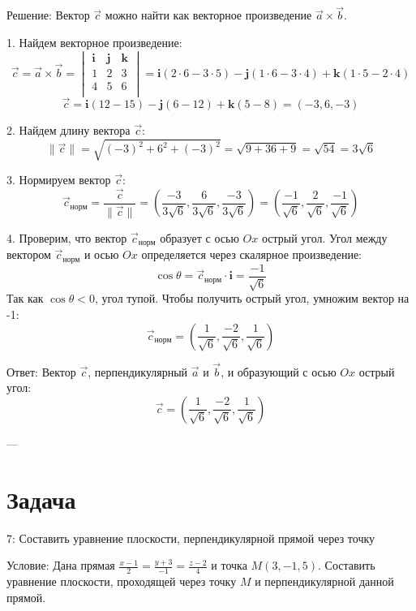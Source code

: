 \documentclass[a4paper,14pt]{extreport} %
\begin{document}
 Решение:   
Вектор \( \vec{c} \) можно найти как векторное произведение \( \vec{a} \times \vec{b} \).

1. Найдем векторное произведение:
   \[
   \vec{c} = \vec{a} \times \vec{b} = 
   \begin{vmatrix}
   \mathbf{i} & \mathbf{j} & \mathbf{k} \\
   1 & 2 & 3 \\
   4 & 5 & 6 \\
   \end{vmatrix}
   = \mathbf{i}(2 \cdot 6 - 3 \cdot 5) - \mathbf{j}(1 \cdot 6 - 3 \cdot 4) + \mathbf{k}(1 \cdot 5 - 2 \cdot 4)
   \]
   \[
   \vec{c} = \mathbf{i}(12 - 15) - \mathbf{j}(6 - 12) + \mathbf{k}(5 - 8) = (-3, 6, -3)
   \]

2. Найдем длину вектора \( \vec{c} \):
   \[
   \| \vec{c} \| = \sqrt{(-3)^2 + 6^2 + (-3)^2} = \sqrt{9 + 36 + 9} = \sqrt{54} = 3\sqrt{6}
   \]

3. Нормируем вектор \( \vec{c} \):
   \[
   \vec{c}_{\text{норм}} = \frac{\vec{c}}{\| \vec{c} \|} = \left( \frac{-3}{3\sqrt{6}}, \frac{6}{3\sqrt{6}}, \frac{-3}{3\sqrt{6}} \right) = \left( \frac{-1}{\sqrt{6}}, \frac{2}{\sqrt{6}}, \frac{-1}{\sqrt{6}} \right)
   \]

4. Проверим, что вектор \( \vec{c}_{\text{норм}} \) образует с осью \( Ox \) острый угол.  
   Угол между вектором \( \vec{c}_{\text{норм}} \) и осью \( Ox \) определяется через скалярное произведение:
   \[
   \cos \theta = \vec{c}_{\text{норм}} \cdot \mathbf{i} = \frac{-1}{\sqrt{6}}
   \]
   Так как \( \cos \theta < 0 \), угол тупой.  
   Чтобы получить острый угол, умножим вектор на -1:
   \[
   \vec{c}_{\text{норм}} = \left( \frac{1}{\sqrt{6}}, \frac{-2}{\sqrt{6}}, \frac{1}{\sqrt{6}} \right)
   \]

 Ответ:   
Вектор \( \vec{c} \), перпендикулярный \( \vec{a} \) и \( \vec{b} \), и образующий с осью \( Ox \) острый угол:
\[
\vec{c} = \left( \frac{1}{\sqrt{6}}, \frac{-2}{\sqrt{6}}, \frac{1}{\sqrt{6}} \right)
\]

---

    \section*{Задача}7: Составить уравнение плоскости, перпендикулярной прямой через точку

 Условие:   
Дана прямая \( \frac{x - 1}{2} = \frac{y + 3}{-1} = \frac{z - 2}{4} \) и точка \( M(3, -1, 5) \).  
Составить уравнение плоскости, проходящей через точку \( M \) и перпендикулярной данной прямой.
\end{document}
